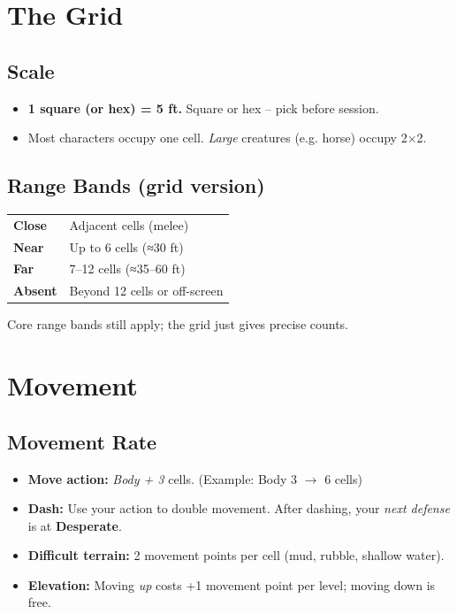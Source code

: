 \documentclass[12pt]{article}
\newcommand{\term}[1]{\textit{#1}}
\newcommand{\pos}[1]{\textbf{#1}}
\begin{document}
\section{The Grid}
\subsection{Scale}
\begin{itemize}[noitemsep]
    \item \textbf{1 square (or hex) = 5 ft.} Square or hex -- pick before session.
    \item Most characters occupy one cell. \term{Large} creatures (e.g. horse) occupy 2×2.
\end{itemize}
\subsection{Range Bands (grid version)}
\begin{tabular}{>{\bfseries}l l}
    Close   & Adjacent cells (melee) \\
    Near    & Up to 6 cells (≈30 ft) \\
    Far     & 7--12 cells (≈35--60 ft) \\
    Absent  & Beyond 12 cells or off-screen \\
\end{tabular}
\noindent Core range bands still apply; the grid just gives precise counts.

\section{Movement}
\subsection{Movement Rate}
\begin{itemize}[noitemsep]
    \item \textbf{Move action:} \term{Body + 3} cells. (Example: Body 3 $\rightarrow$ 6 cells)
    \item \textbf{Dash:} Use your action to double movement. After dashing, your \emph{next defense} is at \pos{Desperate}.
    \item \textbf{Difficult terrain:} 2 movement points per cell (mud, rubble, shallow water).
    \item \textbf{Elevation:} Moving \emph{up} costs +1 movement point per level; moving down is free.
\end{itemize}
\end{document}
